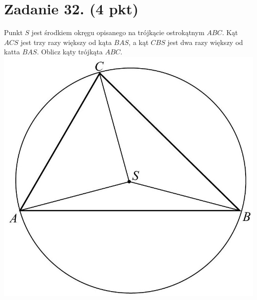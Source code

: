 \documentclass[10pt]{article}
\begin{document}
\section*{Zadanie 32. (4 pkt)}
Punkt \(S\) jest środkiem okręgu opisanego na trójkącie ostrokątnym \(A B C\). Kąt \(A C S\) jest trzy razy większy od kąta \(B A S\), a kąt \(C B S\) jest dwa razy większy od katta \(B A S\). Oblicz kąty trójkąta \(A B C\).\\
\includegraphics[max width=\textwidth, center]{2024_11_21_e0e8aab895018a50a9a7g-16}
\end{document}
